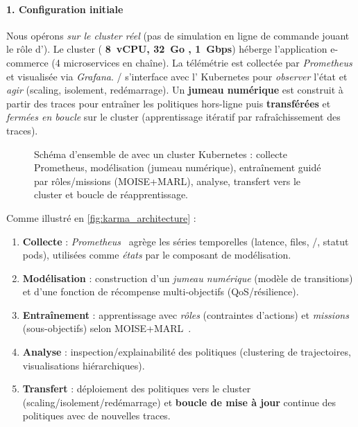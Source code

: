 \paragraph{1. Configuration initiale}

Nous opérons \emph{sur le cluster réel} (pas de simulation en ligne de commande jouant le rôle d'). Le cluster (\textbf{ 8~vCPU, 32~Go , 1~Gbps}) héberge l'application e-commerce (4 microservices en chaîne). La télémétrie est collectée par \textit{Prometheus} et visualisée via \textit{Grafana}. / s'interface avec l' Kubernetes pour \textit{observer} l'état et \textit{agir} (scaling, isolement, redémarrage). Un \textbf{jumeau numérique} est construit à partir des traces pour entraîner les politiques hors-ligne puis \textbf{transférées} et \textit{fermées en boucle} sur le cluster (apprentissage itératif par rafraîchissement des traces).

\begin{figure}[h!]
  \centering
  \resizebox{\textwidth}{!}{%
    
  }
  \caption[Schéma d'ensemble de ]{Schéma d'ensemble de  avec un cluster Kubernetes : collecte Prometheus, modélisation (jumeau numérique), entraînement guidé par rôles/missions (MOISE+MARL), analyse, transfert vers le cluster et boucle de réapprentissage.}
  \label{fig:karma_architecture}
\end{figure}

Comme illustré en \autoref{fig:karma_architecture} :
\begin{enumerate}[label=\textbf{\arabic*)}, leftmargin=3.5mm, itemsep=2pt, topsep=2pt]
  \item \textbf{Collecte} : \textit{Prometheus}~\cite{prometheus} agrège les séries temporelles (latence, files, /, statut pods), utilisées comme \emph{états} par le composant de modélisation.
  \item \textbf{Modélisation} : construction d'un \emph{jumeau numérique} (modèle de transitions) et d'une fonction de récompense multi-objectifs (QoS/résilience).
  \item \textbf{Entraînement} : apprentissage  avec \textit{rôles} (contraintes d'actions) et \textit{missions} (sous-objectifs) selon MOISE+MARL~\cite{soule2024aomea}.
  \item \textbf{Analyse} : inspection/explainabilité des politiques (clustering de trajectoires, visualisations hiérarchiques).
  \item \textbf{Transfert} : déploiement des politiques vers le cluster (scaling/isolement/redémarrage) et \textbf{boucle de mise à jour} continue des politiques avec de nouvelles traces.
\end{enumerate}

